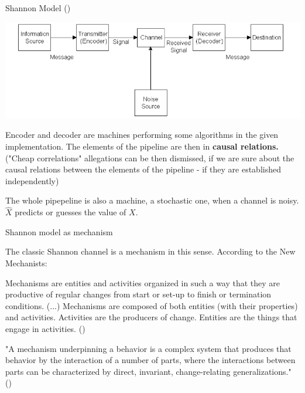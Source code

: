 \documentclass[10pt, aspectratio=169]{beamer}
\begin{document}
\begin{frame}{ Shannon Model (\cite{shannon_mathematical_1948})}

    \includegraphics[width=1\linewidth]{images/latexImage_9d58f9e54772e4e91104b2b791c5c63e.png}
    


Encoder and decoder are  machines performing some algorithms  in the given implementation.
The elements of the pipeline are then in \textbf{causal relations.} ("Cheap correlations" allegations can be then dismissed, if we are sure about the causal relations between the elements of the pipeline - if they are established independently)

    The whole pipepeline is also a machine, a stochastic one, when a channel is noisy.
    {$\hat{X}$} predicts or guesses the value of $X$.
   

\end{frame}


\begin{frame}{Shannon model as mechanism}
 
    The classic Shannon channel is a mechanism in this sense.
    According to the New Mechanists:

    Mechanisms are entities and activities organized in such a way that they are
    productive of regular changes from start or set-up to finish or termination conditions.
    (...)
    Mechanisms are composed of both entities (with their properties) and
    activities. Activities are the producers of change. Entities are the things
    that engage in activities. (\cite{machamer_thinking_2000})

    
    "A mechanism underpinning a behavior is a complex system that produces
    that behavior by the interaction of a number of parts, where the
    interactions between parts can be characterized by direct, invariant,
    change-relating generalizations." (\cite{glennan_rethinking_2002})

   

\end{frame}
\end{document}
